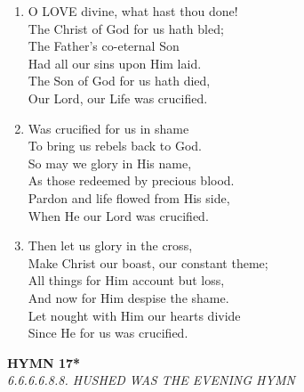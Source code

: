 \documentclass[11pt,a4paper]{article}
\begin{document}
\begin{enumerate}
    \item O LOVE divine, what hast thou done! \\
        The Christ of God for us hath bled; \\
        The Father's co-eternal Son \\
        Had all our sins upon Him laid. \\
        The Son of God for us hath died, \\
        Our Lord, our Life was crucified.

    \item Was crucified for us in shame \\
        To bring us rebels back to God. \\
        So may we glory in His name, \\
        As those redeemed by precious blood. \\
        Pardon and life flowed from His side, \\
        When He our Lord was crucified.

    \item Then let us glory in the cross, \\
        Make Christ our boast, our constant theme; \\
        All things for Him account but loss, \\
        And now for Him despise the shame. \\
        Let nought with Him our hearts divide \\
        Since He for us was crucified.

\end{enumerate}

\newpage
\begin{center}
    {\Large \textbf{HYMN 17*}}
    \\
    \textit{6.6.6.6.8.8. HUSHED WAS THE EVENING HYMN}
\end{center}
\vspace{1em}
\end{document}
